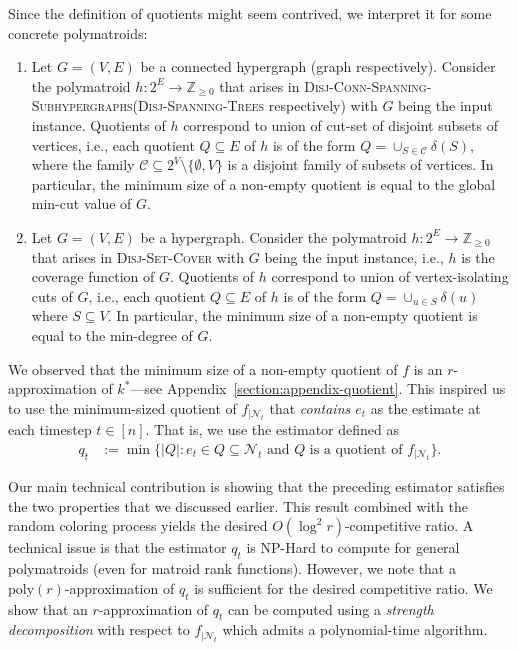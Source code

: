 \documentclass[11pt]{article}
\theoremstyle{definition}
\newcommand{\calN}{{\mathcal{N}}}
\newcommand{\Z}{\mathbb{Z}}
\newcommand{\DSC}{\textsc{Disj-Set-Cover}\xspace}
\newcommand{\DST}{\textsc{Disj-Spanning-Trees}\xspace}
\newcommand{\DCSS}{\textsc{Disj-Conn-Spanning-Subhypergraphs}\xspace}
\begin{document}
Since the definition of quotients might seem contrived, we interpret it for some concrete polymatroids: 
\begin{enumerate}
\item Let $G=(V, E)$ be a connected hypergraph (graph respectively). Consider the polymatroid $h:2^E\rightarrow \Z_{\ge 0}$ that arises in \DCSS (\DST respectively) with $G$ being the input instance. Quotients of $h$ correspond to union of cut-set of disjoint subsets of vertices, i.e., each quotient $Q\subseteq E$ of $h$ is of the form $Q=\cup_{S\in \mathcal{C}}\delta(S)$, where the family $\mathcal{C}\subseteq 2^V\setminus \{\emptyset, V\}$ is a disjoint family of subsets of vertices. In particular, the minimum size of a non-empty quotient is equal to the global min-cut value of $G$. 
\item Let $G=(V, E)$ be a hypergraph. Consider the polymatroid $h: 2^E\rightarrow \Z_{\ge 0}$ that arises in \DSC with $G$ being the input instance, i.e., $h$ is the coverage function of $G$. Quotients of $h$ correspond to union of vertex-isolating cuts of $G$, i.e., each quotient $Q\subseteq E$ of $h$ is of the form $Q=\cup_{u\in S}\delta(u)$ where  $S\subseteq V$. In particular, the minimum size of a non-empty quotient is equal to the min-degree of $G$. \end{enumerate}


We observed that the minimum size of a non-empty quotient of $f$ is an $r$-approximation of $k^*$---see Appendix~\ref{section:appendix-quotient}. This inspired us to use the minimum-sized quotient of $f_{|\calN_t}$ that \emph{contains $e_t$} as the estimate at each timestep $t\in [n]$. That is, we use the estimator defined as 
\begin{align}\label{techniques:estimate-q_t}
    q_t&:=\min \{|Q|: e_t\in Q \subseteq \mathcal{N}_t \text{ and $Q$ is a quotient of $f_{|\mathcal{N}_t}$}\}.
\end{align}

Our main technical contribution is showing that the preceding estimator satisfies the two properties that we discussed earlier.
This result combined with the random coloring process yields the desired $O(\log^2 r)$-competitive ratio.
A technical issue is that the estimator $q_t$ is NP-Hard to compute for general polymatroids (even for matroid rank functions). 
However, we note that a $\text{poly}(r)$-approximation of $q_t$ is sufficient for the desired competitive ratio. We show that an $r$-approximation of $q_t$ can be computed using a \emph{strength decomposition} with respect to $f_{|\mathcal{N}_t}$ which admits a polynomial-time algorithm.
\end{document}
